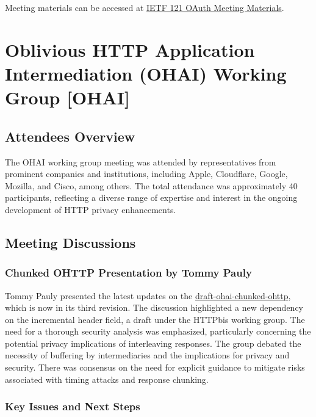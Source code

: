 \documentclass{article}
\begin{document}
Meeting materials can be accessed at \href{https://datatracker.ietf.org/meeting/121/materials/slides-121-oauth-oauth-identity-and-authorization-chaining-across-domains-00}{IETF 121 OAuth Meeting Materials}.




\newpage

\section{Oblivious HTTP Application Intermediation (OHAI) Working Group [OHAI]}

\subsection{Attendees Overview}

The OHAI working group meeting was attended by representatives from prominent companies and institutions, including Apple, Cloudflare, Google, Mozilla, and Cisco, among others. The total attendance was approximately 40 participants, reflecting a diverse range of expertise and interest in the ongoing development of HTTP privacy enhancements.

\subsection{Meeting Discussions}

\subsubsection{Chunked OHTTP Presentation by Tommy Pauly}

Tommy Pauly presented the latest updates on the \href{https://datatracker.ietf.org/doc/html/draft-ohai-chunked-ohttp}{draft-ohai-chunked-ohttp}, which is now in its third revision. The discussion highlighted a new dependency on the incremental header field, a draft under the HTTPbis working group. The need for a thorough security analysis was emphasized, particularly concerning the potential privacy implications of interleaving responses. The group debated the necessity of buffering by intermediaries and the implications for privacy and security. There was consensus on the need for explicit guidance to mitigate risks associated with timing attacks and response chunking.

\subsubsection{Key Issues and Next Steps}
\end{document}
